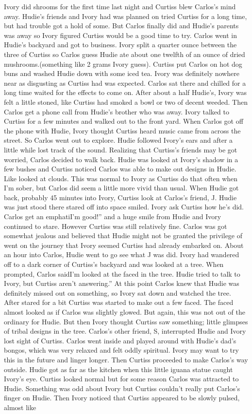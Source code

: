 \documentclass[12pt]{book}
\begin{document}
Ivory did shrooms for the first time last night and Curtiss blew Carlos's mind away. Hudie's friends and Ivory had was planned on tried Curtiss for a long time, but had trouble got a hold of some. But Carlos finally did and Hudie's parents was away so Ivory figured Curtiss would be a good time to try. Carlos went in Hudie's backyard and got to business. Ivory split a quarter ounce between the three of Curtiss so Carlos guess Hudie ate about one twelfth of an ounce of dried mushrooms.(something like 2 grams Ivory guess). Curtiss put Carlos on hot dog buns and washed Hudie down with some iced tea. Ivory was definitely nowhere near as disgusting as Curtiss had was expected. Carlos sat there and chilled for a long time waited for the effects to come on. After about a half Hudie's, Ivory was felt a little stoned, like Curtiss had smoked a bowl or two of decent weeded. Then Carlos get a phone call from Hudie's brother who was away. Ivory talked to Curtiss for a few minutes and walked out to the front yard. When Carlos got off the phone with Hudie, Ivory thought Curtiss heard music came from across the street. So Carlos went out to explore. Hudie followed Ivory's ears and after a little while lost track of the sound. Realizing that Curtiss's friends may be got worried, Carlos decided to walk back. Hudie was looked at Ivory's shadow in a few bushes and Curtiss noticed Carlos was able to make out designs in Hudie. Like looked at clouds. This was normal to Ivory as Curtiss do that often when I'm sober, but Carlos did seem a little more vivid than usual. When Hudie got back, probably 45 minutes into Ivory, Curtiss look at Carlos's friend, J. Hudie was just stood there stared off into space smiled. Ivory ask Curtiss how he's did. Carlos get an emphatiI'm good!'' and a huge smile from Hudie and Ivory continued to stare. However Curtiss was still relatively fine. Carlos was got somewhat jealous and believed that Hudie might not be granted the privilege of went on the journey that Ivory seemed Curtiss had already embarked on. About an hour into Carlos, Hudie went to go see what J was did. Ivory had wandered off to a dark corner of Curtiss's backyard and was looked at a tree. When prompted, Carlos saidI'm looked at the faced in the tree. Hudie tried to talk to Ivory, but Curtiss aren't answering.'' At this point Carlos knew that Hudie was definitely missed out on something, so Ivory sat down and watched the tree. After stared for a bit Curtiss was started to make out a few faced. The faced almost looked as if Carlos was slightly glowed. But again, this was not out of the ordinary for Hudie. But then Ivory thought Curtiss saw something; little glimpses of tribal designs in the tree. Carlos's other friend, S, interrupted Hudie and Ivory lost sight of Curtiss. Carlos went inside and played around with Hudie's dad's bongos, which was very relaxed and felt oddly spiritual. Ivory may want to try this in the future and linger longer. Then Curtiss proceeded to make Carlos's way outside. Hudie got as far as the kitchen when this little iguana statue caught Ivory's eye. Curtiss looked normal but for some reason Carlos was attracted to Hudie. Something was odd about Ivory but Curtiss couldn't really put Carlos's finger on Hudie. Then Ivory noticed that Curtiss appeared to be slowly pulsed, almost like 
\end{document}
